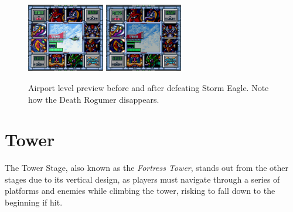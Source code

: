 \begin{figure}[htp]
	\centering
		\includegraphics[height=3cm]{figures/X1/Storm_eagle/Storm_prev_1.jpg}
		\includegraphics[height=3cm]{figures/X1/Storm_eagle/Storm_prev_2.jpg}
	\caption{Airport level preview before and after defeating Storm Eagle. Note how the Death Rogumer disappears.}
\end{figure}


\section{Tower}
The Tower Stage, also known as the \textit{Fortress Tower}, stands out from the other stages due to its vertical design, as players must navigate through a series of platforms and enemies while climbing the tower, risking to fall down to the beginning if hit.

